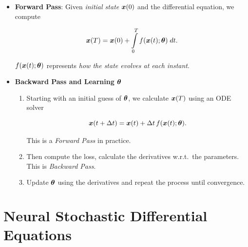 \begin{itemize}

\item \textbf{Forward Pass}: Given \textit{initial state} $\boldsymbol{x}(0)$ and the differential equation, we compute

$$
\boldsymbol{x}(T) = \boldsymbol{x}(0) + \int \limits_0^T f(\boldsymbol{x}(t); \boldsymbol{\theta}) \; dt.
$$

$f(\boldsymbol{x}(t); \boldsymbol{\theta})$ represents \textit{how the state evolves at each instant}.



\item \textbf{Backward Pass and Learning $\boldsymbol{\theta}$}

\begin{enumerate}

\item Starting with an initial guess of $\boldsymbol{\theta}$, we calculate $\boldsymbol{x}(T)$ using an ODE solver

$$
\boldsymbol{x}(t+\Delta t)
=
\boldsymbol{x}(t)+\Delta t\, f(\boldsymbol{x}(t); \boldsymbol{\theta}).
$$

This is a \textit{Forward Pass} in practice.

\item Then compute the loss, calculate the derivatives w.r.t.\ the parameters. This is \textit{Backward Pass}.

\item Update $\boldsymbol{\theta}$ using the derivatives and repeat the process until convergence.

\end{enumerate}

\end{itemize}


\section{Neural Stochastic Differential Equations}

